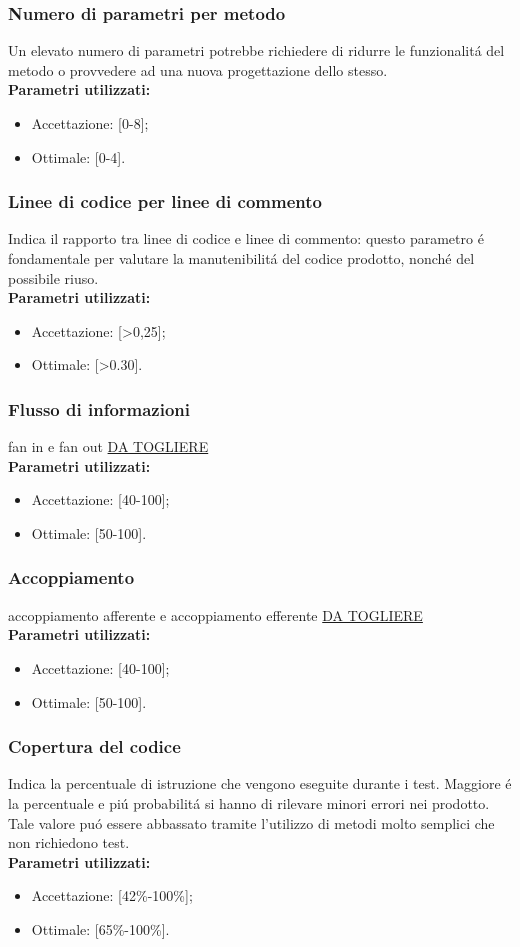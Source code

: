 \subsubsection{Numero di parametri per metodo}
Un elevato numero di parametri potrebbe richiedere di ridurre le funzionalit\'a del metodo o provvedere ad una nuova progettazione dello stesso.\\
\textbf{Parametri utilizzati:}
\begin{itemize}
\item Accettazione: [0-8];
\item Ottimale: [0-4].
\end{itemize}
\subsubsection{Linee di codice per linee di commento}
Indica il rapporto tra linee di codice e linee di commento: questo parametro \'e fondamentale per valutare la manutenibilit\'a del codice prodotto, nonch\'e del possibile riuso.\\
\textbf{Parametri utilizzati:}
\begin{itemize}
\item Accettazione: [>0,25];
\item Ottimale: [>0.30].
\end{itemize}
\subsubsection{Flusso di informazioni}
fan in e fan out \underline{DA TOGLIERE}\\
\textbf{Parametri utilizzati:}
\begin{itemize}
\item Accettazione: [40-100];
\item Ottimale: [50-100].
\end{itemize}
\subsubsection{Accoppiamento}
accoppiamento afferente e accoppiamento efferente \underline{DA TOGLIERE}\\
\textbf{Parametri utilizzati:}
\begin{itemize}
\item Accettazione: [40-100];
\item Ottimale: [50-100].
\end{itemize}
\subsubsection{Copertura del codice}
Indica la percentuale di istruzione che vengono eseguite durante i test. Maggiore \'e la percentuale e pi\'u probabilit\'a si hanno di rilevare minori errori nei prodotto. Tale valore pu\'o essere abbassato tramite l'utilizzo di metodi molto semplici che non richiedono test.\\
\textbf{Parametri utilizzati:}
\begin{itemize}
\item Accettazione: [42\%-100\%];
\item Ottimale: [65\%-100\%].
\end{itemize}
